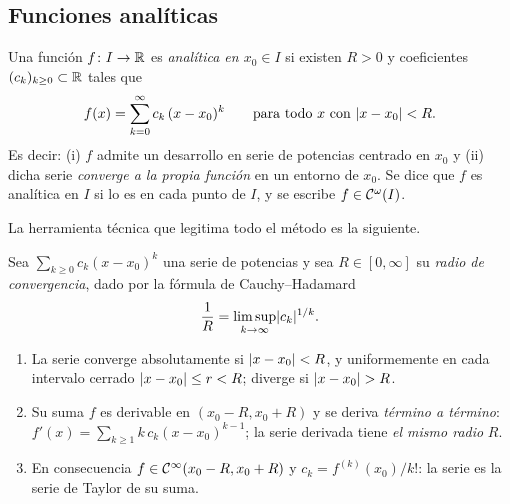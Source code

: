 \subsection{Funciones analíticas}\label{sec:analiticas}

\begin{definicion}\label{def:analitica}
Una función $f\colon I\to\mathbb{R}$ es \emph{analítica en $x_0\in I$} si existen
$R>0$ y coeficientes $(c_k)_{k\ge0}\subset\mathbb{R}$ tales que
\begin{equation}\label{eq:analitica}
  f(x)=\sum_{k=0}^{\infty}c_k\,(x-x_0)^k
  \qquad\text{para todo } x \text{ con } \lvert x-x_0\rvert<R .
\end{equation}
Es decir: \textup{(i)} $f$ admite un desarrollo en serie de potencias
centrado en $x_0$ y \textup{(ii)} dicha serie \emph{converge a la propia
función} en un entorno de $x_0$. Se dice que $f$ es analítica en $I$ si lo es
en cada punto de $I$, y se escribe $f\in\mathcal{C}^{\omega}(I)$.
\end{definicion}

La herramienta técnica que legitima todo el método es la siguiente.

\begin{teorema}\label{teo:series}
Sea $\sum_{k\ge0}c_k(x-x_0)^k$ una serie de potencias y sea $R\in[0,\infty]$
su \emph{radio de convergencia}, dado por la fórmula de Cauchy--Hadamard
\begin{equation}\label{eq:hadamard}
  \frac1R=\limsup_{k\to\infty}\lvert c_k\rvert^{1/k}.
\end{equation}
\begin{enumerate}[label=\textup{(\roman*)}]
  \item La serie converge absolutamente si $\lvert x-x_0\rvert<R$, y uniformemente
        en cada intervalo cerrado $\lvert x-x_0\rvert\le r<R$; diverge si
        $\lvert x-x_0\rvert>R$.
  \item Su suma $f$ es derivable en $(x_0-R,x_0+R)$ y se deriva
        \emph{término a término}:
        $f'(x)=\sum_{k\ge1}k\,c_k(x-x_0)^{k-1}$; la serie derivada tiene
        \emph{el mismo radio} $R$.
  \item En consecuencia $f\in\mathcal{C}^{\infty}(x_0-R,x_0+R)$ y
        $c_k=f^{(k)}(x_0)/k!$: la serie es la serie de Taylor de su suma.
\end{enumerate}
\end{teorema}

